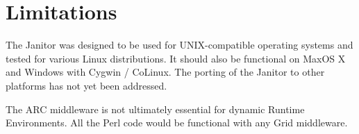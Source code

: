 
\section{Limitations}

The Janitor was designed to be used for UNIX-compatible operating systems
and tested for various Linux distributions. It should also be functional
on MaxOS X and Windows with Cygwin / CoLinux.  The porting of the Janitor
to other platforms has not yet been addressed.

The ARC middleware is not ultimately essential for dynamic Runtime
Environments.  All the Perl code would be functional with any Grid
middleware.

